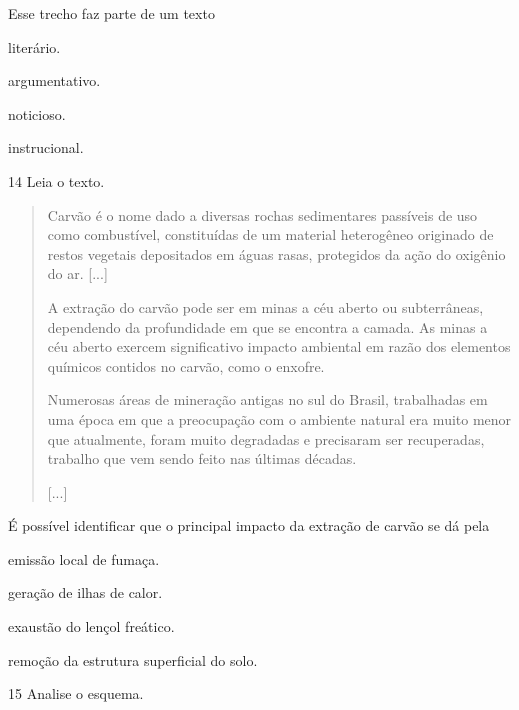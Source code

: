 Esse trecho faz parte de um texto

\begin{escolha}
\item literário.

\item argumentativo.

\item noticioso.

\item instrucional.
\end{escolha}

\num{14} Leia o texto.

\begin{quote}
Carvão é o nome dado a diversas rochas sedimentares passíveis
de uso como combustível, constituídas de um material heterogêneo
originado de restos vegetais depositados em águas rasas, protegidos da
ação do oxigênio do ar. {[}...{]}

A extração do carvão pode ser em minas a céu aberto ou
subterrâneas, dependendo da profundidade em que se encontra a camada. As
minas a céu aberto exercem significativo impacto ambiental em razão dos
elementos químicos contidos no carvão, como o enxofre.

Numerosas áreas de mineração antigas no sul do Brasil, trabalhadas
em uma época em que a preocupação com o ambiente natural era muito menor
que atualmente, foram muito degradadas e precisaram ser recuperadas,
trabalho que vem sendo feito nas últimas décadas.

{[}...{]}

\end{quote}

É possível identificar que o principal impacto da extração de carvão se dá pela

\begin{escolha}
\item
  emissão local de fumaça.
\item
  geração de ilhas de calor.
\item
  exaustão do lençol freático.
\item
  remoção da estrutura superficial do solo.
\end{escolha}

\num{15} Analise o esquema.



